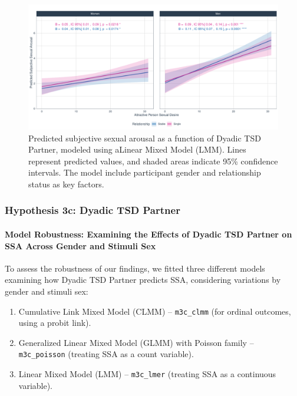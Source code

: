 \documentclass[
  bookmarksnumbered]{article}
\providecommand{\tightlist}{%
  \setlength{\itemsep}{0pt}\setlength{\parskip}{0pt}}
\begin{document}
\begin{figure}
\centering
\includegraphics{Sexual_Desire_Arousal_anonymous_files/figure-latex/fig-h3b-1.pdf}
\caption{\label{fig:fig-h3b}Predicted subjective sexual arousal as a function of Dyadic TSD Partner, modeled using aLinear Mixed Model (LMM). Lines represent predicted values, and shaded areas indicate 95\% confidence intervals. The model include participant gender and relationship status as key factors.}
\end{figure}

\subsubsection{Hypothesis 3c: Dyadic TSD Partner}\label{hyp3c}

\paragraph{Model Robustness: Examining the Effects of Dyadic TSD Partner on SSA Across Gender and Stimuli Sex}\label{model-robustness-examining-the-effects-of-dyadic-tsd-partner-on-ssa-across-gender-and-stimuli-sex-1}

To assess the robustness of our findings, we fitted three different models examining how Dyadic TSD Partner predicts SSA, considering variations by gender and stimuli sex:

\begin{enumerate}
\def\labelenumi{\arabic{enumi}.}
\tightlist
\item
  Cumulative Link Mixed Model (CLMM) -- \texttt{m3c\_clmm} (for ordinal outcomes, using a probit link).
\item
  Generalized Linear Mixed Model (GLMM) with Poisson family -- \texttt{m3c\_poisson} (treating SSA as a count variable).
\item
  Linear Mixed Model (LMM) -- \texttt{m3c\_lmer} (treating SSA as a continuous variable).
\end{enumerate}
\end{document}
